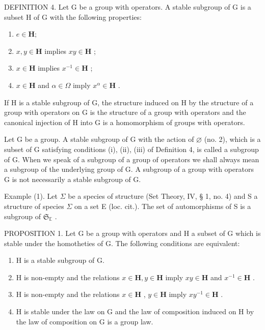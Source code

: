 DEFINITION 4. Let G be a group with operators. A stable subgroup of G is a subset H of G with the following properties:

\begin{enumerate}
\def\labelenumi{(\roman{enumi})}
\item
  \(e\in \mathbf{H};\)
\item
  \(x, y \in \mathbf{H}\) implies \(xy \in \mathbf{H}\) ;
\item
  \(x \in \mathbf{H}\) implies \(x^{-1} \in \mathbf{H}\) ;
\item
  \(x \in \mathbf{H}\) and \(\alpha \in \Omega\) imply \(x^{\alpha} \in \mathbf{H}\) .
\end{enumerate}

If H is a stable subgroup of G, the structure induced on H by the structure of a group with operators on G is the structure of a group with operators and the canonical injection of H into G is a homomorphism of groups with operators.

Let G be a group. A stable subgroup of G with the action of \(\varnothing\) (no. 2), which is a subset of G satisfying conditions (i), (ii), (iii) of Definition 4, is called a subgroup of G. When we speak of a subgroup of a group of operators we shall always mean a subgroup of the underlying group of G. A subgroup of a group with operators G is not necessarily a stable subgroup of G.

Example (1). Let \(\Sigma\) be a species of structure (Set Theory, IV, § 1, no. 4) and S a structure of species \(\Sigma\) on a set E (loc. cit.). The set of automorphisms of S is a subgroup of \(\mathfrak{S}_{\mathbb{E}}\) .

PROPOSITION 1. Let G be a group with operators and H a subset of G which is stable under the homotheties of G. The following conditions are equivalent:

\begin{enumerate}
\def\labelenumi{(\alph{enumi})}
\item
  H is a stable subgroup of G.
\item
  H is non-empty and the relations \(x \in \mathbf{H}, y \in \mathbf{H}\) imply \(xy \in \mathbf{H}\) and \(x^{-1} \in \mathbf{H}\) .
\item
  H is non-empty and the relations \(x \in \mathbf{H}\) , \(y \in \mathbf{H}\) imply \(xy^{-1} \in \mathbf{H}\) .
\item
  H is stable under the law on G and the law of composition induced on H by the law of composition on G is a group law.
\end{enumerate}


